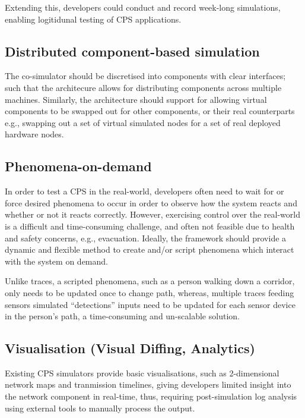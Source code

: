 Extending this, developers could conduct and record week-long simulations, enabling logitidunal testing of CPS applications.

\subsection{Distributed component-based simulation} %
\label{sub:distributed}
The co-simulator should be discretised into components with clear interfaces; such that the architecure allows for distributing components across multiple machines. Similarly, the architecture should support for allowing virtual components to be swapped out for other components, or their real counterparts e.g., swapping out a set of virtual simulated nodes for a set of real deployed hardware nodes.


\subsection{Phenomena-on-demand}
\label{sub:requirements_Phenomena-on-demand}
In order to test a CPS in the real-world, developers often need to wait for or force desired phenomena to occur in order to observe how the system reacts and whether or not it reacts correctly. However, exercising control over the real-world is a difficult and time-consuming challenge, and often not feasible due to health and safety concerns, e.g., evacuation. 
Ideally, the framework should provide a dynamic and flexible method to create and/or script phenomena which interact with the system on demand.

Unlike traces, a scripted phenomena, such as a person walking down a corridor, only needs to be updated once to change path, whereas, multiple traces feeding sensors simulated ``detections'' inputs need to be updated for each sensor device in the person's path, a time-consuming and un-scalable solution.


\subsection{Visualisation (Visual Diffing, Analytics)}
\label{sub:requirements_Visualisation}
Existing CPS simulators provide basic visualisations, such as 2-dimensional network maps and tranmission timelines, giving developers limited insight into the network component in real-time, thus, requiring post-simulation log analysis using external tools to manually process the output.

